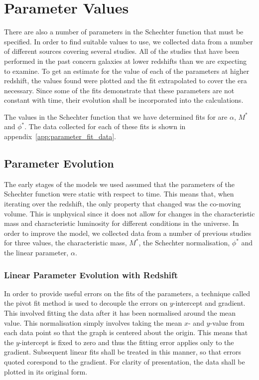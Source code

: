 
\section{Parameter Values} %
\label{sec:parameter_values}
    There are also a number of parameters in the Schechter function that must be specified. In order to find suitable values to use, we collected data from a number of different sources covering several studies. All of the studies that have been performed in the past concern galaxies at lower redshifts than we are expecting to examine. To get an estimate for the value of each of the parameters at higher redshift, the values found were plotted and the fit extrapolated to cover the era necessary. Since some of the fits demonstrate that these parameters are not constant with time, their evolution shall be incorporated into the calculations.

    The values in the Schechter function that we have determined fits for are $\alpha$, $M^{*}$ and $\phi^{*}$. The data collected for each of these fits is shown in appendix~\ref{app:parameter_fit_data}.

    \subsection{Parameter Evolution} %
    \label{sub:parameter_evolution}
        The early stages of the models we used assumed that the parameters of the Schechter function were static with respect to time. This means that, when iterating over the redshift, the only property that changed was the co-moving volume. This is unphysical since it does not allow for changes in the characteristic mass and characteristic luminosity for different conditions in the universe. In order to improve the model, we collected data from a number of previous studies for three values, the characteristic mass, $M^*$, the Schechter normalisation, $\phi^*$ and the linear parameter, $\alpha$.

        \subsubsection{Linear Parameter Evolution with Redshift} %
        \label{ssub:linear_parameter_evolution_with_redshift}

            In order to provide useful errors on the fits of the parameters, a technique called the pivot fit method is used to decouple the errors on $y$-intercept and gradient. This involved fitting the data after it has been normalised around the mean value. This normalisation simply involves taking the mean $x$- and $y$-value from each data point so that the graph is centered about the origin. This means that the $y$-intercept is fixed to zero and thus the fitting error applies only to the gradient. Subsequent linear fits shall be treated in this manner, so that errors quoted corespond to the gradient. For clarity of presentation, the data shall be plotted in its original form.

